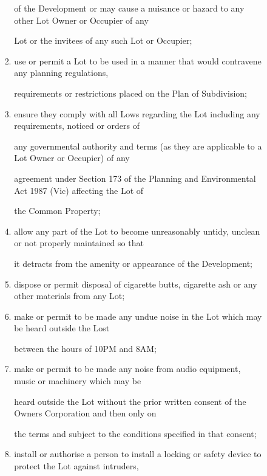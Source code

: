 \documentclass{article}
\begin{document}
\begin{enumerate}[label=\arabic*.]
\begin{enumerate}[label=\arabic{enumi}.\arabic*.]
\begin{enumerate}[label=(\arabic*)]
\begin{enumerate}[label=(\alph*)]
{\fontsize{10.02}{1}of the Development or may cause a nuisance or hazard to any other Lot Owner or Occupier of any }

{\fontsize{10.02}{1}Lot or the invitees of any such Lot or Occupier; }

\item {\fontsize{9.962}{1} use or permit a Lot to be used in a manner that would contravene any planning regulations, }

{\fontsize{10.02}{1}requirements or restrictions placed on the Plan of Subdivision; }

\item {\fontsize{9.962}{1} ensure they comply with all Lows regarding the Lot including any requirements, noticed or orders of }

{\fontsize{10.02}{1}any governmental authority and terms (as they are applicable to a Lot Owner or Occupier) of any }

{\fontsize{10.02}{1}agreement under Section 173 of the Planning and Environmental Act 1987 (Vic) affecting the Lot of }

{\fontsize{10.02}{1}the Common Property; }

\item {\fontsize{9.962}{1} allow any part of the Lot to become unreasonably untidy, unclean or not properly maintained so that }

{\fontsize{10.02}{1}it detracts from the amenity or appearance of the Development; }

\item {\fontsize{9.962}{1} dispose or permit disposal of cigarette butts, cigarette ash or any other materials from any Lot; }

\item {\fontsize{9.962}{1} make or permit to be made any undue noise in the Lot which may be heard outside the Lost }

{\fontsize{10.02}{1}between the hours of 10PM and 8AM; }

\item {\fontsize{9.962}{1} make or permit to be made any noise from audio equipment, music or machinery which may be }

{\fontsize{10.02}{1}heard outside the Lot without the prior written consent of the Owners Corporation and then only on }

{\fontsize{10.02}{1}the terms and subject to the conditions specified in that consent; }

\item {\fontsize{9.962}{1} install or authorise a person to install a locking or safety device to protect the Lot against intruders, }


\end{enumerate}
\end{enumerate}
\end{enumerate}
\end{enumerate}
\end{document}
